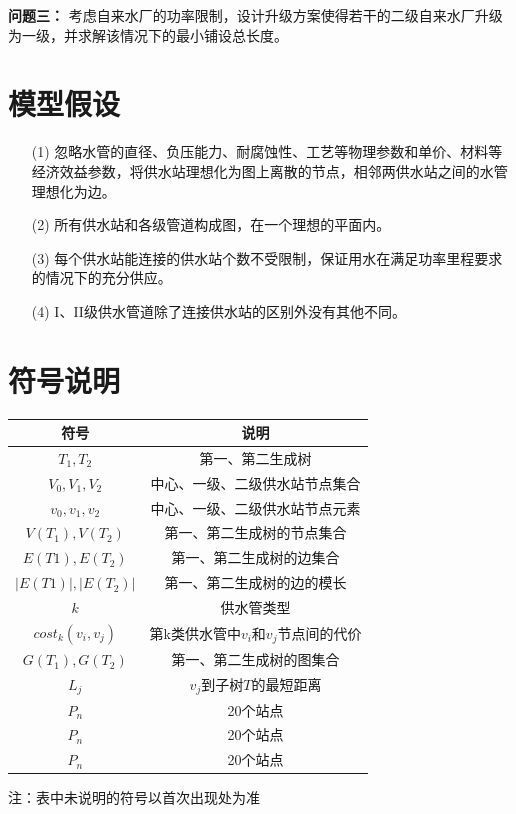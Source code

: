 \documentclass{whutmod}
\begin{document}
			\textbf{问题三：}
            考虑自来水厂的功率限制，设计升级方案使得若干的二级自来水厂升级为一级，并求解该情况下的最小铺设总长度。
	
	\section{模型假设}
		\begin{itemize}                                             
		\item [(1)]忽略水管的直径、负压能力、耐腐蚀性、工艺等物理参数和单价、材料等经济效益参数，将供水站理想化为图上离散的节点，相邻两供水站之间的水管理想化为边。
		\item [(2)]所有供水站和各级管道构成图，在一个理想的平面内。
		\item[(3)]每个供水站能连接的供水站个数不受限制，保证用水在满足功率里程要求的情况下的充分供应。
		\item [(4)]I、II级供水管道除了连接供水站的区别外没有其他不同。
		\end{itemize}

		
	\section{符号说明}
		\begin{table}[H]
		\centering
		\setlength{\tabcolsep}{12mm}
		\begin{tabular}{cc}
			\toprule[1.5pt]
			\multicolumn{1}{m{5cm}}{\centering 符号} & \multicolumn{1}{m{5cm}}{\centering 说明} \\
			\midrule[1pt]		
			$T_1,T_2$  & 第一、第二生成树  \\ 
			$V_0,V_1,V_2$  & 中心、一级、二级供水站节点集合  \\ 
			$v_0,v_1,v_2$  & 中心、一级、二级供水站节点元素  \\ 
			$V(T_1),V(T_2)$  & 第一、第二生成树的节点集合 \\ 
		   	$E(T1),E(T_2)$  &第一、第二生成树的边集合\\ 
		   	$|E(T1)|,|E(T_2)|$  & 第一、第二生成树的边的模长 \\ 
		   	$k$  & 供水管类型 \\
		   	$cost_k(v_i,v_j)$  & 第k类供水管中$v_i$和$v_j$节点间的代价 \\ 
		   	$G(T_1),G(T_2)$  &第一、第二生成树的图集合  \\ 
		   	$L_j$  & $v_j$到子树$T$的最短距离  \\ 
		   	$P_n$  & 20个站点  \\ 
		   	$P_n$  & 20个站点  \\ 
		   	$P_n$  & 20个站点  \\ 
			\bottomrule[1.5pt]
		\end{tabular}
		\begin{tablenotes}
		\item 注：表中未说明的符号以首次出现处为准
		\end{tablenotes}
		\end{table}
\end{document}
